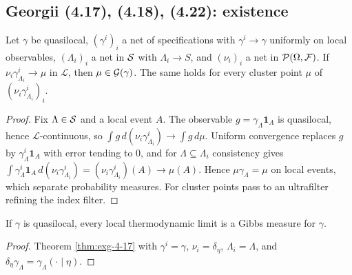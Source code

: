 \subsection*{Georgii (4.17), (4.18), (4.22): existence}

\begin{theorem}[Georgii (4.17)]
    \label{thm:exg-4-17}
    \leanok

    Let $\gamma$ be quasilocal, $(\gamma^i)_{i}$ a net of specifications with
    $\gamma^i\to\gamma$ uniformly on local observables, $(\Lambda_i)_i$ a net in $\mathcal{S}$ with
    $\Lambda_i\to S$, and $(\nu_i)_i$ a net in $\mathcal{P}(\Omega,\mathcal F)$. If
    $\nu_i\gamma^i_{\Lambda_i}\to\mu$ in $\mathcal L$, then $\mu\in\mathcal{G}(\gamma)$. The same
    holds for every cluster point $\mu$ of $(\nu_i\gamma^i_{\Lambda_i})_i$.
\end{theorem}
\begin{proof}
    \leanok

    Fix $\Lambda\in\mathcal{S}$ and a local event $A$. The observable $g=\gamma_\Lambda \mathbf 1_A$
    is quasilocal, hence $\mathcal L$-continuous, so $\int g\,d(\nu_i\gamma^i_{\Lambda_i})
    \to\int g\,d\mu$. Uniform convergence replaces $g$ by $\gamma^i_\Lambda\mathbf 1_A$ with
    error tending to $0$, and for $\Lambda\subseteq\Lambda_i$ consistency gives
    $\int\gamma^i_\Lambda\mathbf 1_A\,d(\nu_i\gamma^i_{\Lambda_i})
    = (\nu_i\gamma^i_{\Lambda_i})(A)\to\mu(A)$. Hence $\mu\gamma_\Lambda=\mu$ on local
    events, which separate probability measures. For cluster points pass to an ultrafilter
    refining the index filter.
\end{proof}

\begin{corollary}
    \label{cor:exg-4-18}
    \leanok

    If $\gamma$ is quasilocal, every local thermodynamic limit is a Gibbs measure for
    $\gamma$.
\end{corollary}
\begin{proof}
    \leanok

    Theorem \ref{thm:exg-4-17} with $\gamma^i=\gamma$, $\nu_i=\delta_\eta$, $\Lambda_i=\Lambda$,
    and $\delta_\eta\gamma_\Lambda = \gamma_\Lambda(\cdot\mid\eta)$.
\end{proof}

